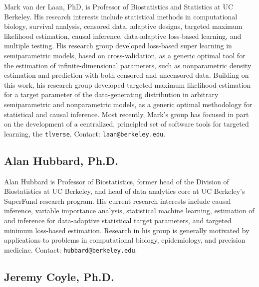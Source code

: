 \documentclass[a4paper,11pt]{texMemo}
\begin{document}
\vspace{-.5em}

Mark van der Laan, PhD, is Professor of Biostatistics and Statistics at UC
Berkeley. His research interests include statistical methods in computational
biology, survival analysis, censored data, adaptive designs, targeted maximum
likelihood estimation, causal inference, data-adaptive loss-based learning, and
multiple testing. His research group developed loss-based super learning in
semiparametric models, based on cross-validation, as a generic optimal tool for
the estimation of infinite-dimensional parameters, such as nonparametric density
estimation and prediction with both censored and uncensored data. Building on
this work, his research group developed targeted maximum likelihood estimation
for a target parameter of the data-generating distribution in arbitrary
semiparametric and nonparametric models, as a generic optimal methodology for
statistical and causal inference. Most recently, Mark's group has focused in
part on the development of a centralized, principled set of software tools for
targeted learning, the \texttt{tlverse}. Contact: \texttt{laan@berkeley.edu}.

\vspace{-.5em}

\subsection*{Alan Hubbard, Ph.D.}

\vspace{-.5em}

Alan Hubbard is Professor of Biostatistics, former head of the Division of
Biostatistics at UC Berkeley, and head of data analytics core at UC Berkeley's
SuperFund research program. His current research interests include causal
inference, variable importance analysis, statistical machine learning,
estimation of and inference for data-adaptive statistical target parameters, and
targeted minimum loss-based estimation. Research in his group is generally
motivated by applications to problems in computational biology, epidemiology,
and precision medicine. Contact: \texttt{hubbard@berkeley.edu}.

\vspace{-.5em}

\subsection*{Jeremy Coyle, Ph.D.}
\end{document}

